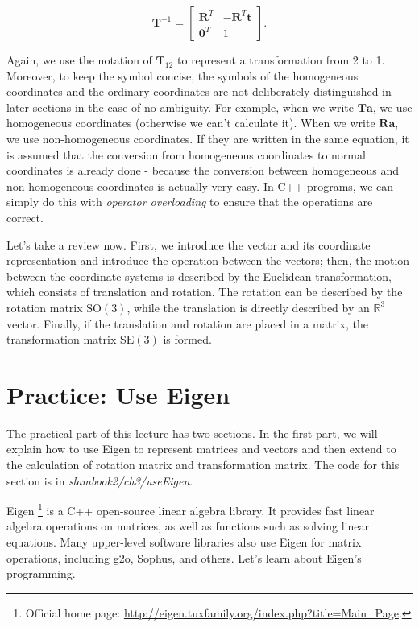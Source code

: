 \begin{equation}
{ \mathbf{T}^{ - 1}} = \left[ {\begin{array}{*{20}{c}}
    {{\mathbf{R}^T}}&{ - {\mathbf{R}^T}\mathbf{t}}\\
    {{\mathbf{0}^T}}&1
    \end{array}} \right].
\end{equation}

Again, we use the notation of $ \mathbf{T}_{12} $ to represent a transformation from 2 to 1. Moreover, to keep the symbol concise, the symbols of the homogeneous coordinates and the ordinary coordinates are not deliberately distinguished in later sections in the case of no ambiguity. For example, when we write $ \mathbf {T} \mathbf{a} $, we use homogeneous coordinates (otherwise we can't calculate it). When we write $ \mathbf{Ra} $, we use non-homogeneous coordinates. If they are written in the same equation, it is assumed that the conversion from homogeneous coordinates to normal coordinates is already done - because the conversion between homogeneous and non-homogeneous coordinates is actually very easy. In C++ programs, we can simply do this with \textit{operator overloading} to ensure that the operations are correct.

Let's take a review now. First, we introduce the vector and its coordinate representation and introduce the operation between the vectors; then, the motion between the coordinate systems is described by the Euclidean transformation, which consists of translation and rotation. The rotation can be described by the rotation matrix $ \mathrm{SO}( 3 ) $, while the translation is directly described by an $ \mathbb{R}^ 3 $ vector. Finally, if the translation and rotation are placed in a matrix, the transformation matrix $ \mathrm{SE}( 3 ) $ is formed.

\section{Practice: Use Eigen}
The practical part of this lecture has two sections. In the first part, we will explain how to use Eigen to represent matrices and vectors and then extend to the calculation of rotation matrix and transformation matrix. The code for this section is in \textit{slambook2/ch3/useEigen}.

Eigen \footnote{Official home page: \url{http://eigen.tuxfamily.org/index.php?title=Main_Page}. } is a C++ open-source linear algebra library. It provides fast linear algebra operations on matrices, as well as functions such as solving linear equations. Many upper-level software libraries also use Eigen for matrix operations, including g2o, Sophus, and others. Let's learn about Eigen's programming.

